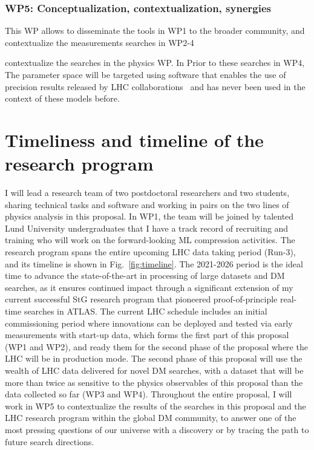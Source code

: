 \documentclass[11pt,a4paper]{article}
\begin{document}
\subsubsection*{WP5: Conceptualization, contextualization, synergies}

This WP allows to disseminate the tools in WP1 to the broader community, and contextualize the measurements searches in WP2-4

contextualize the searches in the physics WP. In 
Prior to these searches in WP4, The parameter space will be targeted using software that enables the use of precision results released by LHC collaborations~\cite{CONTUR} and has never been used in the context of these models before. 

\section{Timeliness and timeline of the research program} 
\smallskip

I will lead a research team of two postdoctoral researchers and two students, sharing technical tasks and software and working in pairs on the two lines of physics analysis in this proposal.  
In WP1, the team will be joined by talented Lund University undergraduates that I have a track record of recruiting and training who will work on the forward-looking ML compression activities.
The research program spans the entire upcoming LHC data taking period (Run-3), and its timeline is shown in Fig.~\ref{fig:timeline}. 
The 2021-2026 period is the ideal time to advance the state-of-the-art in processing of large datasets and DM searches, as it ensures continued impact through a significant extension of my current successful StG research program that pioneered proof-of-principle real-time searches in ATLAS. 
The current LHC schedule includes an initial commissioning period where innovations can be deployed and tested via early measurements with start-up data, which forms the first part of this proposal (WP1 and WP2), and ready them for the second phase of the proposal where the LHC will be in production mode.   
The second phase of this proposal will use the wealth of LHC data delivered for novel DM searches, with a dataset that will be more than \color{red}twice \color{black} as sensitive to the physics observables of this proposal than the data collected so far (WP3 and WP4). 
Throughout the entire proposal, I will work in WP5 to contextualize the results of the searches in this proposal and the LHC research program within the global DM community, to answer one of the most pressing questions of our universe with a discovery or by tracing the path to future search directions. 
\end{document}
